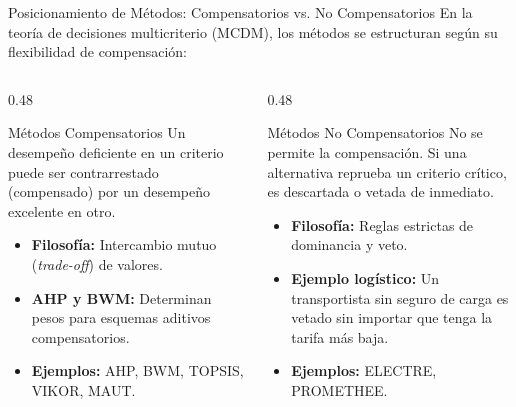 \documentclass[aspectratio=169, 10pt]{beamer}
\begin{document}
\begin{frame}{Posicionamiento de Métodos: Compensatorios vs. No Compensatorios}
    En la teoría de decisiones multicriterio (MCDM), los métodos se estructuran según su flexibilidad de compensación:
    \begin{columns}[T]
        \begin{column}{0.48\textwidth}
            \begin{block}{Métodos Compensatorios}
                \scriptsize
                Un desempeño deficiente en un criterio puede ser contrarrestado (compensado) por un desempeño excelente en otro.
                \begin{itemize}
                    \item \textbf{Filosofía:} Intercambio mutuo (\textit{trade-off}) de valores.
                    \item \textbf{AHP y BWM:} Determinan pesos para esquemas aditivos compensatorios.
                    \item \textbf{Ejemplos:} AHP, BWM, TOPSIS, VIKOR, MAUT.
                \end{itemize}
            \end{block}
        \end{column}
        
        \begin{column}{0.48\textwidth}
            \begin{exampleblock}{Métodos No Compensatorios}
                \scriptsize
                No se permite la compensación. Si una alternativa reprueba un criterio crítico, es descartada o vetada de inmediato.
                \begin{itemize}
                    \item \textbf{Filosofía:} Reglas estrictas de dominancia y veto.
                    \item \textbf{Ejemplo logístico:} Un transportista sin seguro de carga es vetado sin importar que tenga la tarifa más baja.
                    \item \textbf{Ejemplos:} ELECTRE, PROMETHEE.
                \end{itemize}
            \end{exampleblock}
        \end{column}
    \end{columns}
\end{frame}
\end{document}
